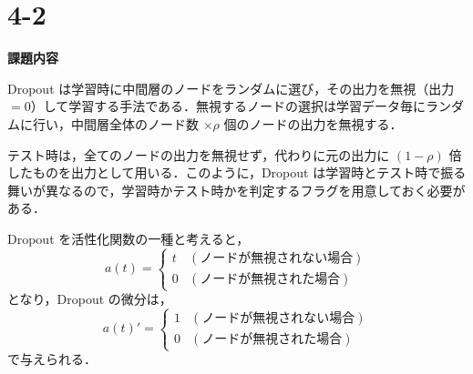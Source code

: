 \documentclass[11px,a4,dvipdfmx]{jsarticle}
\begin{document}
\section{4-2}
\begin{center}
\textbf{課題内容}
\end{center}
Dropout は学習時に中間層のノードをランダムに選び，その出力を無視（出力 $= 0$）して学習する手法である．無視するノードの選択は学習データ毎にランダムに行い，中間層全体のノード数 $\times \rho$ 個のノードの出力を無視する．

テスト時は，全てのノードの出力を無視せず，代わりに元の出力に $(1 - \rho)$ 倍したものを出力として用いる．このように，Dropout は学習時とテスト時で振る舞いが異なるので，学習時かテスト時かを判定するフラグを用意しておく必要がある．

Dropout を活性化関数の一種と考えると，
\begin{equation}
a(t) = 
\begin{cases}
t & (\text{ノードが無視されない場合}) \\
0 & (\text{ノードが無視された場合})
\end{cases}
\end{equation}
となり，Dropout の微分は，
\begin{equation}
a(t)' = 
\begin{cases}
1 & (\text{ノードが無視されない場合}) \\
0 & (\text{ノードが無視された場合})
\end{cases}
\end{equation}
で与えられる．
\end{document}
